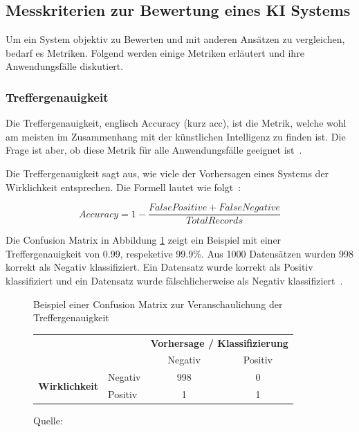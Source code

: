 \subsection{Messkriterien zur Bewertung eines KI Systems}

Um ein System objektiv zu Bewerten und mit anderen Ansätzen zu vergleichen, bedarf es Metriken. Folgend werden einige Metriken erläutert und ihre Anwendungsfälle diskutiert.

\subsubsection{Treffergenauigkeit}

Die Treffergenauigkeit, englisch Accuracy (kurz acc), ist die Metrik, welche wohl am meisten im Zusammenhang mit der künstlichen Intelligenz zu finden ist. Die Frage ist aber, ob diese Metrik für alle Anwendungsfälle geeignet ist~\autocite{TDSAccuracy}.

Die Treffergenauigkeit sagt aus, wie viele der Vorhersagen eines Systems der Wirklichkeit entsprechen. Die Formell lautet wie folgt~\autocite{TDSAccuracy}: 

$$Accuracy = 1 - \frac{False Positive + False Negative}{Total Records}$$

Die Confusion Matrix in Abbildung \ref{cm-sample} zeigt ein Beispiel mit einer Treffergenauigkeit von 0.99, respeketive 99.9\%. Aus 1000 Datensätzen wurden 998 korrekt als Negativ klassifiziert. Ein Datensatz wurde korrekt als Positiv klassifiziert und ein Datensatz wurde fälschlicherweise als Negativ klassifiziert~\autocite{TDSAccuracy}.

\begin{figure}[h!]
    \centering
    \captionsetup{width=.9\linewidth}
    \caption{Beispiel einer Confusion Matrix zur Veranschaulichung der Treffergenauigkeit}
    \def\arraystretch{1.5}
    \begin{tabular}{llcc}
        \multicolumn{2}{l}{}                                                                       & \multicolumn{2}{c}{\textbf{Vorhersage / Klassifizierung}}   \\ \cline{3-4} 
        \multicolumn{1}{c}{\textbf{}}                               & \multicolumn{1}{l|}{}        & \multicolumn{1}{c|}{Negativ} & \multicolumn{1}{c|}{Positiv} \\ \cline{2-4} 
        \multicolumn{1}{l|}{\multirow{2}{*}{\textbf{Wirklichkeit}}} & \multicolumn{1}{l|}{Negativ} & \multicolumn{1}{c|}{998}    & \multicolumn{1}{c|}{0}       \\ \cline{2-4} 
        \multicolumn{1}{l|}{}                                       & \multicolumn{1}{l|}{Positiv} & \multicolumn{1}{c|}{1}       & \multicolumn{1}{c|}{1}       \\ \cline{2-4} 
    \end{tabular}
    \caption*{Quelle: \textcite{TDSAccuracy}}
    \label{cm-sample}
\end{figure}

